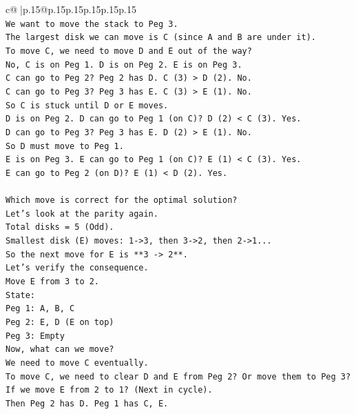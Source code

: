 \documentclass{article}
\begin{document}
{\begin{supertabular}{c@{$\;$}|p{.15\linewidth}@{}p{.15\linewidth}p{.15\linewidth}p{.15\linewidth}p{.15\linewidth}p{.15\linewidth}}
{{{\\ 
\texttt{We want to move the stack to Peg 3.} \\
\texttt{The largest disk we can move is C (since A and B are under it).} \\
\texttt{To move C, we need to move D and E out of the way?} \\
\texttt{No, C is on Peg 1. D is on Peg 2. E is on Peg 3.} \\
\texttt{C can go to Peg 2? Peg 2 has D. C (3) > D (2). No.} \\
\texttt{C can go to Peg 3? Peg 3 has E. C (3) > E (1). No.} \\
\texttt{So C is stuck until D or E moves.} \\
\texttt{D is on Peg 2. D can go to Peg 1 (on C)? D (2) < C (3). Yes.} \\
\texttt{D can go to Peg 3? Peg 3 has E. D (2) > E (1). No.} \\
\texttt{So D must move to Peg 1.} \\
\texttt{E is on Peg 3. E can go to Peg 1 (on C)? E (1) < C (3). Yes.} \\
\texttt{E can go to Peg 2 (on D)? E (1) < D (2). Yes.} \\
\\ 
\texttt{Which move is correct for the optimal solution?} \\
\texttt{Let's look at the parity again.} \\
\texttt{Total disks = 5 (Odd).} \\
\texttt{Smallest disk (E) moves: 1{-}>3, then 3{-}>2, then 2{-}>1...} \\
\texttt{So the next move for E is **3 {-}> 2**.} \\
\texttt{Let's verify the consequence.} \\
\texttt{Move E from 3 to 2.} \\
\texttt{State:} \\
\texttt{Peg 1: A, B, C} \\
\texttt{Peg 2: E, D (E on top)} \\
\texttt{Peg 3: Empty} \\
\texttt{Now, what can we move?} \\
\texttt{We need to move C eventually.} \\
\texttt{To move C, we need to clear D and E from Peg 2? Or move them to Peg 3?} \\
\texttt{If we move E from 2 to 1? (Next in cycle).} \\
\texttt{Then Peg 2 has D. Peg 1 has C, E.} \\
}}}
\end{supertabular}}
\end{document}
